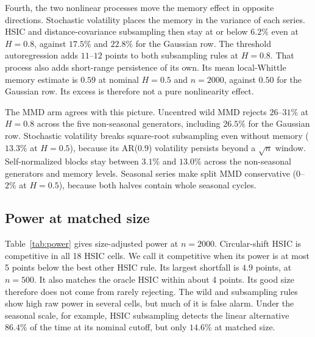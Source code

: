 \documentclass[11pt]{article}
\theoremstyle{remark}
\begin{document}
Fourth, the two nonlinear processes move the memory effect in opposite directions. Stochastic volatility places the memory in the variance of each series. HSIC and distance-covariance subsampling then stay at or below $6.2\%$ even at $H=0.8$, against $17.5\%$ and $22.8\%$ for the Gaussian row. The threshold autoregression adds $11$--$12$ points to both subsampling rules at $H=0.8$. That process also adds short-range persistence of its own. Its mean local-Whittle memory estimate is $0.59$ at nominal $H=0.5$ and $n=2000$, against $0.50$ for the Gaussian row. Its excess is therefore not a pure nonlinearity effect.

The MMD arm agrees with this picture. Uncentred wild MMD rejects $26$--$31\%$ at $H=0.8$ across the five non-seasonal generators, including $26.5\%$ for the Gaussian row. Stochastic volatility breaks square-root subsampling even without memory ($13.3\%$ at $H=0.5$), because its AR(0.9) volatility persists beyond a $\sqrt n$ window. Self-normalized blocks stay between $3.1\%$ and $13.0\%$ across the non-seasonal generators and memory levels. Seasonal series make split MMD conservative ($0$--$2\%$ at $H=0.5$), because both halves contain whole seasonal cycles.

\subsection{Power at matched size}\label{sec:power}
Table~\ref{tab:power} gives size-adjusted power at $n=2000$. Circular-shift HSIC is competitive in all 18 HSIC cells. We call it competitive when its power is at most 5 points below the best other HSIC rule. Its largest shortfall is $4.9$ points, at $n=500$. It also matches the oracle HSIC within about 4 points. Its good size therefore does not come from rarely rejecting. The wild and subsampling rules show high raw power in several cells, but much of it is false alarm. Under the seasonal scale, for example, HSIC subsampling detects the linear alternative $86.4\%$ of the time at its nominal cutoff, but only $14.6\%$ at matched size.
\end{document}
